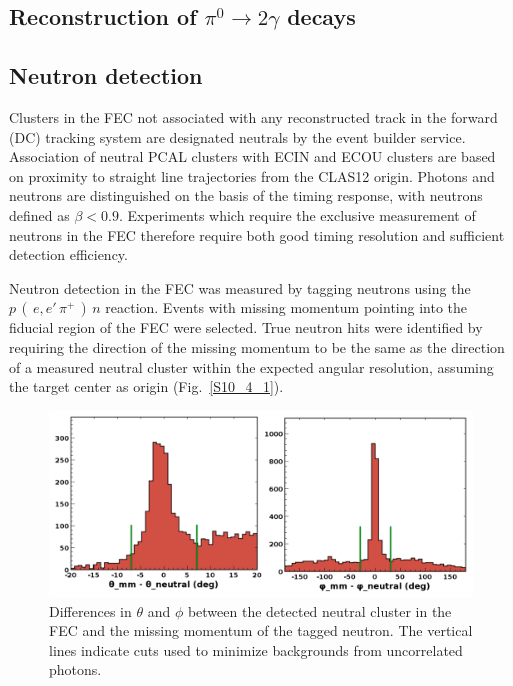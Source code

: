 \subsection{Reconstruction of $\pi^0\rightarrow 2\gamma$ decays}


\subsection{Neutron detection}
Clusters in the FEC not associated with any reconstructed track in the forward (DC) tracking system are designated neutrals by the event builder service.  Association of neutral PCAL clusters with ECIN and ECOU clusters are based on proximity to straight line trajectories from the CLAS12 origin.  Photons and neutrons are distinguished on the basis of the timing response, with neutrons defined as $\beta < 0.9$.  Experiments which require the exclusive measurement of neutrons in the FEC therefore require both good timing resolution and sufficient detection efficiency. 

Neutron detection in the FEC was measured by tagging neutrons using the $p\,(\,e,e'\,\pi^+\,)\,n$ reaction. Events with missing momentum pointing into the fiducial region of the FEC were selected.  True neutron hits were identified by requiring the direction of the missing momentum to be the same as the direction of a measured neutral cluster within the expected angular resolution, assuming the target center
as origin (Fig.~\ref{S10_4_1}).  

\begin{figure}[hbt]
\centering
\includegraphics[width=1.0\columnwidth,keepaspectratio]{img/S10_4_1.png}
\caption[]{Differences in $\theta$ and $\phi$ between the detected neutral cluster in the FEC and the missing momentum of the tagged neutron.  The vertical lines indicate cuts used to minimize backgrounds from uncorrelated photons.}
\label{fig:S10_4_1}
\end{figure}

